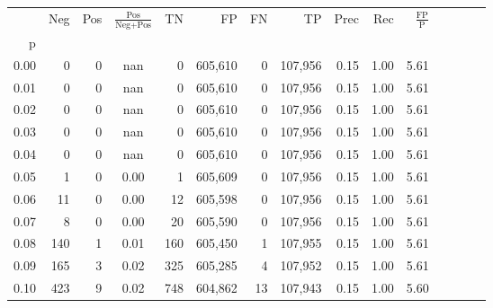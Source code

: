 \begin{tabular}{rrrcrrrrrrrrrrr}
\toprule
{} &     Neg &    Pos & $\frac{\text{Pos}}{\text{Neg}+\text{Pos}}$ &       TN &       FP &       FN &       TP &  Prec &   Rec & $\frac{\text{FP}}{\text{P}}$ \\
p    &         &        &                                            &          &          &          &          &       &       &                              \\
\midrule
0.00 &       0 &      0 &                                        nan &        0 &  605,610 &        0 &  107,956 &  0.15 &  1.00 &                         5.61 \\
0.01 &       0 &      0 &                                        nan &        0 &  605,610 &        0 &  107,956 &  0.15 &  1.00 &                         5.61 \\
0.02 &       0 &      0 &                                        nan &        0 &  605,610 &        0 &  107,956 &  0.15 &  1.00 &                         5.61 \\
0.03 &       0 &      0 &                                        nan &        0 &  605,610 &        0 &  107,956 &  0.15 &  1.00 &                         5.61 \\
0.04 &       0 &      0 &                                        nan &        0 &  605,610 &        0 &  107,956 &  0.15 &  1.00 &                         5.61 \\
0.05 &       1 &      0 &                                       0.00 &        1 &  605,609 &        0 &  107,956 &  0.15 &  1.00 &                         5.61 \\
0.06 &      11 &      0 &                                       0.00 &       12 &  605,598 &        0 &  107,956 &  0.15 &  1.00 &                         5.61 \\
0.07 &       8 &      0 &                                       0.00 &       20 &  605,590 &        0 &  107,956 &  0.15 &  1.00 &                         5.61 \\
0.08 &     140 &      1 &                                       0.01 &      160 &  605,450 &        1 &  107,955 &  0.15 &  1.00 &                         5.61 \\
0.09 &     165 &      3 &                                       0.02 &      325 &  605,285 &        4 &  107,952 &  0.15 &  1.00 &                         5.61 \\
0.10 &     423 &      9 &                                       0.02 &      748 &  604,862 &       13 &  107,943 &  0.15 &  1.00 &                         5.60 \\

\end{tabular}

